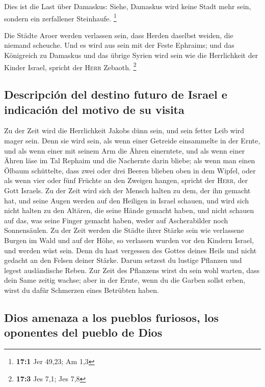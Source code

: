  Dies ist die Last über Damaskus: Siehe, Damaskus wird
keine Stadt mehr sein, sondern ein zerfallener Steinhaufe. \footnote{\textbf{17:1}
  Jer 49,23; Am 1,3}

 Die Städte Aroer werden verlassen sein, dass Herden
daselbst weiden, die niemand scheuche.  Und es wird aus
sein mit der Feste Ephraims; und das Königreich zu Damaskus und das
übrige Syrien wird sein wie die Herrlichkeit der Kinder Israel, spricht
der \textsc{Herr} Zebaoth. \footnote{\textbf{17:3} Jes 7,1; Jes 7,8}

\hypertarget{descripciuxf3n-del-destino-futuro-de-israel-e-indicaciuxf3n-del-motivo-de-su-visita}{%
\subsection{Descripción del destino futuro de Israel e indicación del
motivo de su
visita}\label{descripciuxf3n-del-destino-futuro-de-israel-e-indicaciuxf3n-del-motivo-de-su-visita}}

 Zu der Zeit wird die Herrlichkeit Jakobs dünn sein, und
sein fetter Leib wird mager sein.  Denn sie wird sein, als
wenn einer Getreide einsammelte in der Ernte, und als wenn einer mit
seinem Arm die Ähren einerntete, und als wenn einer Ähren läse im Tal
Rephaim  und die Nachernte darin bliebe; als wenn man
einen Ölbaum schüttelte, dass zwei oder drei Beeren blieben oben in dem
Wipfel, oder als wenn vier oder fünf Früchte an den Zweigen hangen,
spricht der \textsc{Herr}, der Gott Israels.  Zu der Zeit
wird sich der Mensch halten zu dem, der ihn gemacht hat, und seine Augen
werden auf den Heiligen in Israel schauen,  und wird sich
nicht halten zu den Altären, die seine Hände gemacht haben, und nicht
schauen auf das, was seine Finger gemacht haben, weder auf Ascherabilder
noch Sonnensäulen.  Zu der Zeit werden die Städte ihrer
Stärke sein wie verlassene Burgen im Wald und auf der Höhe, so verlassen
wurden vor den Kindern Israel, und werden wüst sein. 
Denn du hast vergessen des Gottes deines Heils und nicht gedacht an den
Felsen deiner Stärke. Darum setzest du lustige Pflanzen und legest
ausländische Reben.  Zur Zeit des Pflanzens wirst du sein
wohl warten, dass dein Same zeitig wachse; aber in der Ernte, wenn du
die Garben sollst erben, wirst du dafür Schmerzen eines Betrübten haben.

\hypertarget{dios-amenaza-a-los-pueblos-furiosos-los-oponentes-del-pueblo-de-dios}{%
\subsection{Dios amenaza a los pueblos furiosos, los oponentes del
pueblo de
Dios}\label{dios-amenaza-a-los-pueblos-furiosos-los-oponentes-del-pueblo-de-dios}}

